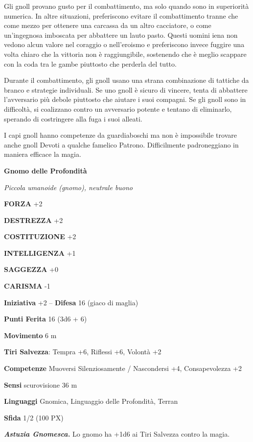 \begin{multicols}{2}
Gli gnoll provano gusto per il combattimento, ma solo quando sono in superiorità numerica. In altre situazioni, preferiscono evitare il combattimento tranne che come mezzo per ottenere una carcassa da un altro cacciatore, o come un'ingegnosa imboscata per abbattere un lauto pasto. Questi uomini iena non vedono alcun valore nel coraggio o nell'eroismo e preferiscono invece fuggire una volta chiaro che la vittoria non è raggiungibile, sostenendo che è meglio scappare con la coda tra le gambe piuttosto che perderla del tutto.

Durante il combattimento, gli gnoll usano una strana combinazione di tattiche da branco e strategie individuali. Se uno gnoll è sicuro di vincere, tenta di abbattere l'avversario più debole piuttosto che aiutare i suoi compagni. Se gli gnoll sono in difficoltà, si coalizzano contro un avversario potente e tentano di eliminarlo, sperando di costringere alla fuga i suoi alleati.

I capi gnoll hanno competenze da guardiaboschi ma non è impossibile trovare anche gnoll Devoti a qualche famelico Patrono. Difficilmente padroneggiano in maniera efficace la magia.


\medskip{}\textbf{Gnomo delle Profondità}

\textit{Piccola umanoide (gnomo), neutrale buono}

\textbf{FORZA} +2

\textbf{DESTREZZA} +2

\textbf{COSTITUZIONE} +2

\textbf{INTELLIGENZA} +1

\textbf{SAGGEZZA} +0

\textbf{CARISMA} -1

\textbf{Iniziativa} +2 -- \textbf{Difesa} 16 (giaco di maglia)

\textbf{Punti Ferita} 16 (3d6 + 6)

\textbf{Movimento} 6 m

\textbf{Tiri Salvezza}: Tempra +6, Riflessi +6, Volontà +2

\textbf{Competenze} Muoversi Silenziosamente / Nascondersi +4, Consapevolezza +2

\textbf{Sensi} scurovisione 36 m

\textbf{Linguaggi} Gnomica, Linguaggio delle Profondità, Terran

\textbf{Sfida} 1/2 (100 PX)

\textit{\textbf{Astuzia Gnomesca.}} Lo gnomo ha +1d6 ai Tiri Salvezza contro la magia.


\end{multicols}
